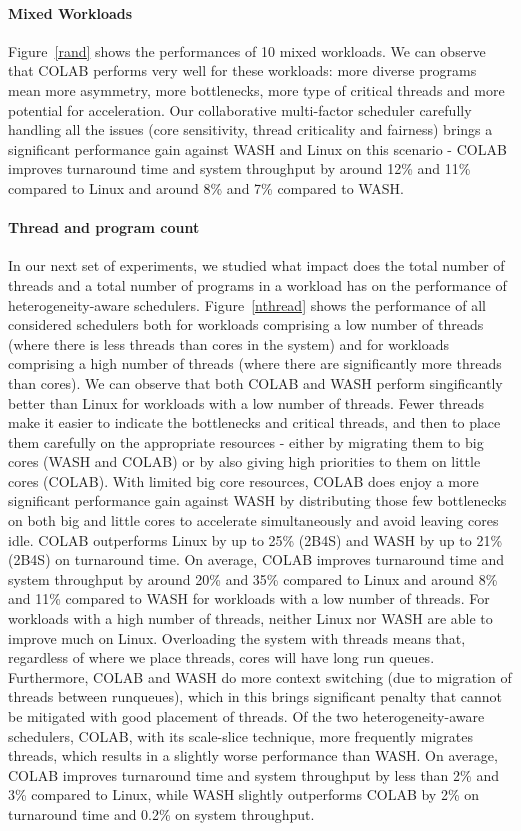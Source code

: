 \paragraph{Mixed Workloads}
Figure~\ref{rand} shows the performances of 10 mixed workloads. We can observe that COLAB performs very well for these workloads: more diverse programs mean more asymmetry, more bottlenecks, more type of critical threads and more potential for acceleration. Our collaborative multi-factor scheduler carefully handling all the issues (core sensitivity, thread criticality and fairness) brings a significant performance gain against WASH and Linux on this scenario - COLAB improves turnaround time and system throughput by around 12\% and 11\% compared to Linux and around 8\% and 7\% compared to WASH.

\paragraph{Thread and program count} In our next set of experiments, we studied what impact does the total number of threads and a total number of programs in a workload has on the performance of heterogeneity-aware schedulers. Figure~\ref{nthread} shows the performance of all considered schedulers both for workloads comprising a low number of threads (where there is less threads than cores in the system) and for workloads comprising a high number of threads (where there are significantly more threads than cores). We can observe that both COLAB and WASH perform singificantly better than Linux for workloads with a low number of threads. Fewer threads make it easier to indicate the bottlenecks and critical threads, and then to place them carefully on the appropriate resources - either by migrating them to big cores (WASH and COLAB) or by also giving high priorities to them on little cores (COLAB). With limited big core resources, COLAB does enjoy a more significant performance gain against WASH by distributing those few bottlenecks on both big and little cores to accelerate simultaneously and avoid leaving cores idle. COLAB outperforms Linux by up to 25\% (2B4S) and WASH by up to 21\% (2B4S) on turnaround time. On average, COLAB improves turnaround time and system throughput by around 20\% and 35\% compared to Linux and around 8\% and 11\% compared to WASH for workloads with a low number of threads. For workloads with a high number of threads, neither Linux nor WASH are able to improve much on Linux. Overloading the system with threads means that, regardless of where we place threads, cores will have long run queues. Furthermore, COLAB and WASH do more context switching (due to migration of threads between runqueues), which in this brings significant penalty that cannot be mitigated with good placement of threads. Of the two heterogeneity-aware schedulers, COLAB, with its scale-slice technique, more frequently migrates threads, which results in a slightly worse performance than WASH. On average, COLAB improves turnaround time and system throughput by less than 2\% and 3\% compared to Linux, while WASH slightly outperforms COLAB by 2\% on turnaround time and 0.2\% on system throughput.

